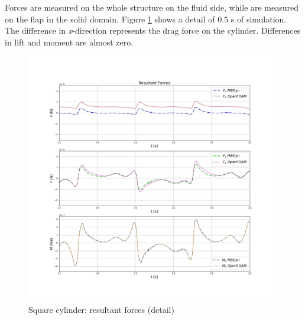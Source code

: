 Forces are measured on the whole structure on the fluid side, while are measured on the flap in the solid domain. Figure \ref{fig:sq_force} shows a detail of $0.5$ \si{s} of simulation. The difference in \textit{x}-direction represents the drag force on the cylinder. Differences in lift and moment are almost zero. 

\begin{figure}[htbp!]
	\centering
	\includegraphics[width=0.98\textwidth, trim=20 100 20 100, clip]{images/sq-cyl/forces_sq.png}
	\caption{Square cylinder: resultant forces (detail)}
	\label{fig:sq_force}
\end{figure}


